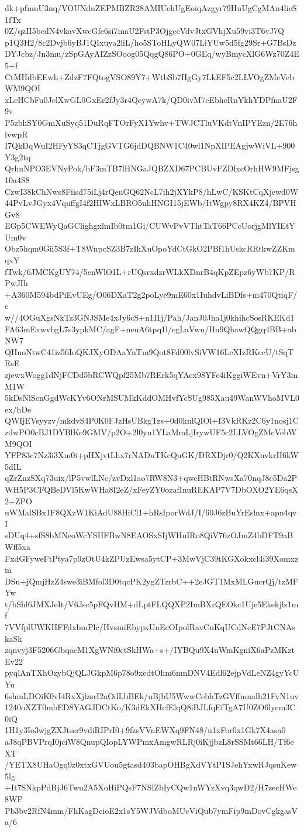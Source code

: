 dk+pfmnU3nq/VOUNdnZEPMBZR28AMIUehUgEoiqAzgyr79HuUgCgMAn4lieS1fTx
0Z/qzII5bcdN4vkavXwcGfe6si7maU2FstP3OjgccVdvJtxGVhjXu59vi3T6vJ7Q
p1Q3H2/8c2Dvjb6yBJ1QIxuya2liL/ho5SToHLyQW07LiYUw5d5fg29Sr+G7BsDz
DYJcbz/Jn3mu/zSpGAyAIZzSOoog05QqgQ86PO+0GEq/wyBmycXlG6Wz70Z4E5+f
CtMHdbEEwh+ZdzF7FQtogVSO89Y7+WtbSb7HgGy7LkEF5c2LLVOgZMcVebWM9QOI
xLeHCbFu0JelXwGL0GxEr2fJy3r4QcywA7k/QD0ivM7eEbhcRnYkhYDPfnaU2F9v
P5zbhSY0GmXuSyq51DuRqFTOrFyX1Ywhv+TWJCTluVKdtVnIPYEzn/2E76hlvwpR
I7QkDqWuI2HFyYS3qCTjgGVTG6jdDQBNW1C40wl1NpXIPEAgjwWiVL+900Y3g2tq
QrhnNPO3EVNyPok/bF3mTB7lHNGaJQBZXD67PCBUvFZDlxcOrhHW9MFjsg10a4S8
CzwI38kChNws8Fiisd75iLj4rQenGQ62NcL7ih2jXYkP8/hLwC/KSKtCqXjewd0W
44PvLvJGyx4VquffgI4f2HIWxLBRO5uhHNGI15jEWb/ItWgpy8RX4KZ4/BPVHGv8
EGp5CWEWyQaGClighgxlmIb0tm1Gi/CUWvPvVThtTaT66PCcUorjgMlYIEtYUm0v
Obz5hqm0Gii5S3f+T8WnpcSZ3B7zIkXuOpoYdCtGkO2PBf1hUskcRRtkwZZKmqxY
fTwk/6JMCKgUY74/5cnWlO1L+rUQsrxdzrWLkXDnrB4qKpZEpz6yWb7KP/RPwJIh
+A360M594bdPiEvUEg/O06DXaT2g2poLye9mE60x1IuhdvLiBDfs+m470QtiqF/c
w//4OGuXgsNkTz3GNJSMe4xJy6cS+n1I1j/Pah/JanJ0Jha1j0khihcSosRKEKd1
FA63mExwvbgL7s3ypkMC/agF+neuA6tpq1l/egLaVwn/Hn9QhawQQgq4BB+abNW7
QHnoNtwC41iz56IoQKJXyODAaYnTm9Qot8Fd00lvSiVW16LcXIzRKccU/tSqTRsE
zjewxWogg1dNjFCDd5bRCWQpf25Mb7RErk5qYAcx98YFe4iKggiWEvn+VrY3mM1W
5kDsNlScnGgdWcKYv6ONrMSUMkKddOMHvfYcSUg985Xau49WanWVhoMVL0ex/hDe
QWIjEVsyyzv/mkdvS4P0K0FJzHsUBkgTzs+0d0knlQIOl+I3VkRKz2C6y1nosj1C
zdwPO0cBJ1DYBlKe9GMV/p2O+2l0yn1YLaMmLjIrywUF5c2LLVOgZMcVebWM9QOI
YFP83c7Nz3i3Xm0i+pHXjvtLhx7rNADuTKcQuGK/DRXDjr0/Q2KXnvkrH6kW5dIL
qZrZnzSXq73uix/lP5vwlLNc/zvDxl1ao7RW8N3+qwcHBtRNwsXa70nqJ8c5Da2P
WH5P3CFQBeDVl5KwWHa8I2eZ/xFeyZY0ozafInuREKAP7V7DbOXO2YE6qsX2+ZPO
uWMalSBx1F8QXzW1KiAdU88HiCl1+hRsIporWdJ/I/60J6zBuYrEslnx+apn4qvI
sDUq4+sfS8bMNeoWcYSHFBwN8EAOSxSIjWHuIRo8QiV76zOJmZ4bDFT9aBWff5xa
FxdGFyweFtPtya7p9zOtU4kZPUzEwsa5ytCP+3MwVjC39tKGXokxcl4i39Xomxzm
DSu+jQmjHzZ4swe3iBMfol3D0tqcPK2ygZTzrbC++2eJGT1MxMLGucrQj/tzMFYw
t/bShl6JMXJeIt/V6Jsc5pFQvHM+dLptFLQQXP2ImBXrQEOkc1Uje5Ekekjlz1mf
7VVfplUWKHFFdxbmPlc/HvsmiEbypxUnEcOIpolRavCnKqUCdNeE7PJtCNAskaSk
zqnvyj3F5206GbqacM1XgWNf0ctSkHWa+s+/IYBQu9X4uWmKgniX6aPzMKztEv22
pyqlAnTXhOzybQjQLJGkpM6p78o9xedtOhm6mnDNV4Edl62ejpVdLeNZ4gyYcUYu
6shmLDOiK0vI4RxXjlzsrI2aOdLbBEk/uBjbU5WwwCebhTzGVffmnalh21FvN1uv
1240oXZT0mbED8YAGJDCtKo/K3dEkXHcfElqQ8iBJLfqEfTgA7U0ZO6lycm3C0iQ
1H1y3Io3wjgZXJtssr9vdiRIPrI0+9fzsVVnEWXq9FN48/u1xFor0x1Gk7X4asa0
aJ8qPBVPrqI0jciW8QnupQIopLYWPmxAmgwRLRj0iKjjbzL8rSSMt66LH/Tf6eXT
/YETX8UHaOgq9z0xtxGVUou5gtasd403bapOHBgXdVYtP1SJehYxwRJqsuKew5lg
+It7SNkpPdRjJ6Twu2A5XoHiPQsF7NSlZbIyCQw1nWYzXvq3qwD2/H7zecHWe8WP
Pb3bv2RfN4mm/FhKagDcioE2x1sY5WJVdboMUcViQub7ymFip9mDovCgkgasVa/6
